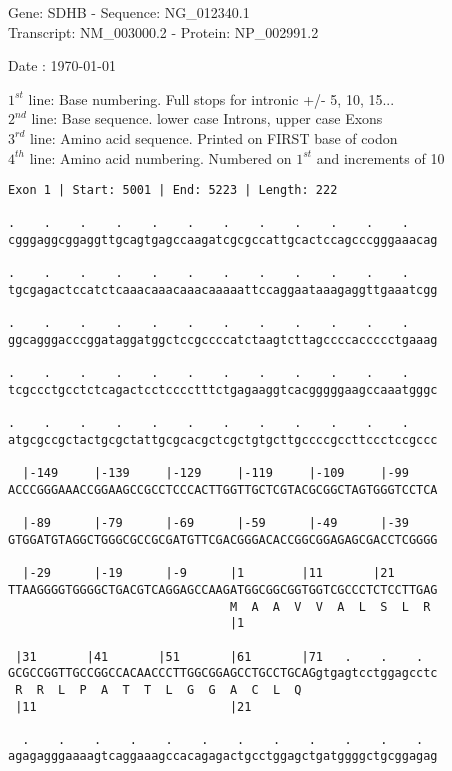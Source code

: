\documentclass{article}
\begin{document}
\begin{center}
\begin{large}
Gene: SDHB - Sequence: NG\_012340.1\\
Transcript: NM\_003000.2 - Protein: NP\_002991.2
 
 Date : \today
\end{large}
\end{center}
$1^{st}$ line: Base numbering. Full stops for intronic +/- 5, 10, 15...\\
$2^{nd}$ line: Base sequence. lower case Introns, upper case Exons\\
$3^{rd}$ line: Amino acid sequence. Printed on FIRST base of codon\\
$4^{th}$ line: Amino acid numbering. Numbered on $1^{st}$ and increments of 10\\
\begin{Verbatim}[fontfamily=courier]
Exon 1 | Start: 5001 | End: 5223 | Length: 222

.    .    .    .    .    .    .    .    .    .    .    .    
cgggaggcggaggttgcagtgagccaagatcgcgccattgcactccagcccgggaaacag

.    .    .    .    .    .    .    .    .    .    .    .    
tgcgagactccatctcaaacaaacaaacaaaaattccaggaataaagaggttgaaatcgg

.    .    .    .    .    .    .    .    .    .    .    .    
ggcagggacccggataggatggctccgccccatctaagtcttagccccaccccctgaaag

.    .    .    .    .    .    .    .    .    .    .    .    
tcgccctgcctctcagactcctcccctttctgagaaggtcacgggggaagccaaatgggc

.    .    .    .    .    .    .    .    .    .    .    .    
atgcgccgctactgcgctattgcgcacgctcgctgtgcttgccccgccttccctccgccc

  |-149     |-139     |-129     |-119     |-109     |-99    
ACCCGGGAAACCGGAAGCCGCCTCCCACTTGGTTGCTCGTACGCGGCTAGTGGGTCCTCA

  |-89      |-79      |-69      |-59      |-49      |-39    
GTGGATGTAGGCTGGGCGCCGCGATGTTCGACGGGACACCGGCGGAGAGCGACCTCGGGG

  |-29      |-19      |-9      |1        |11       |21      
TTAAGGGGTGGGGCTGACGTCAGGAGCCAAGATGGCGGCGGTGGTCGCCCTCTCCTTGAG
                               M  A  A  V  V  A  L  S  L  R 
                               |1                           

 |31       |41       |51       |61       |71   .    .    .  
GCGCCGGTTGCCGGCCACAACCCTTGGCGGAGCCTGCCTGCAGgtgagtcctggagcctc
 R  R  L  P  A  T  T  L  G  G  A  C  L  Q                   
 |11                           |21                          

  .    .    .    .    .    .    .    .    .    .    .    .  
agagagggaaaagtcaggaaagccacagagactgcctggagctgatggggctgcggagag

\end{Verbatim}
\end{document}
